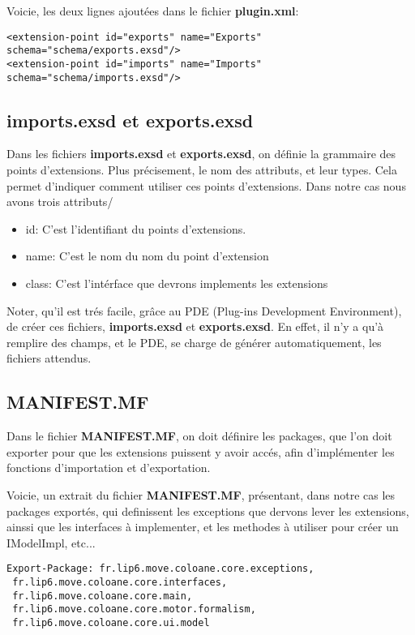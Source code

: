 \documentclass{article}
\begin{document}
Voicie, les deux lignes ajoutées dans le fichier \textbf{plugin.xml}:
\begin{verbatim}
<extension-point id="exports" name="Exports" schema="schema/exports.exsd"/>
<extension-point id="imports" name="Imports" schema="schema/imports.exsd"/>
\end{verbatim}

\subsection{\textbf{imports.exsd} et \textbf{exports.exsd}}
Dans les fichiers \textbf{imports.exsd} et \textbf{exports.exsd}, on définie la grammaire des 
points d'extensions. Plus précisement, le nom des attributs, et leur types. Cela permet 
d'indiquer comment utiliser ces points d'extensions. Dans notre cas nous avons trois attributs/
\begin{itemize}
  \item id: C'est l'identifiant du points d'extensions.
  \item name: C'est le nom du nom du point d'extension
  \item class: C'est l'intérface que devrons implements les extensions
\end{itemize}
Noter, qu'il est trés facile, grâce au PDE (Plug-ins Development Environment), de créer ces fichiers, 
\textbf{imports.exsd} et \textbf{exports.exsd}. En effet, il n'y a qu'à remplire des champs, et le PDE, se 
charge de générer automatiquement, les fichiers attendus.

\subsection{MANIFEST.MF}
Dans le fichier \textbf{MANIFEST.MF}, on doit définire les packages, que l'on doit exporter 
pour que les extensions puissent y avoir accés, afin d'implémenter les fonctions 
d'importation et d'exportation.

Voicie, un extrait du fichier \textbf{MANIFEST.MF}, présentant, dans notre 
cas les packages exportés, qui definissent les exceptions que dervons lever les extensions, ainssi que les interfaces 
à implementer, et les methodes à utiliser pour créer un IModelImpl, etc...

\begin{verbatim}
Export-Package: fr.lip6.move.coloane.core.exceptions,
 fr.lip6.move.coloane.core.interfaces,
 fr.lip6.move.coloane.core.main,
 fr.lip6.move.coloane.core.motor.formalism,
 fr.lip6.move.coloane.core.ui.model
\end{verbatim}
\end{document}
